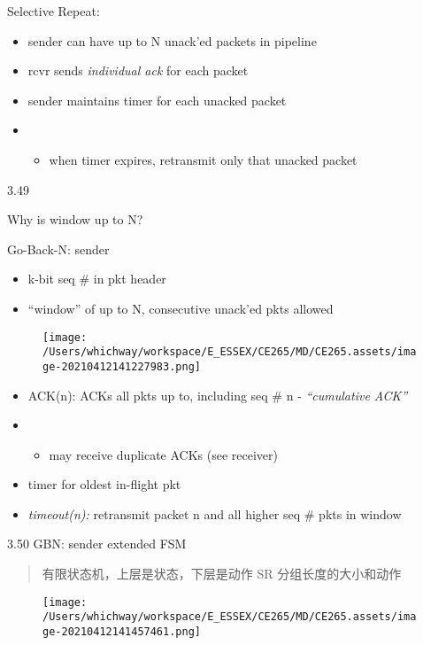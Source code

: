 \documentclass[
]{article}
\begin{document}
Selective Repeat:

\begin{itemize}
\item
  sender can have up to N unack'ed packets in pipeline
\item
  rcvr sends \emph{individual ack} for each packet
\item
  sender maintains timer for each unacked packet
\item
  \begin{itemize}
  \item
    when timer expires, retransmit only that unacked packet
  \end{itemize}
\end{itemize}

3.49

Why is window up to N?

Go-Back-N: sender

\begin{itemize}
\item
  k-bit seq \# in pkt header
\item
  ``window'' of up to N, consecutive unack'ed pkts allowed
\end{itemize}

\begin{figure}
\centering
\texttt{[image: /Users/whichway/workspace/E\_ESSEX/CE265/MD/CE265.assets/image-20210412141227983.png]}
\caption{}
\end{figure}

\begin{itemize}
\item
  ACK(n): ACKs all pkts up to, including seq \# n - \emph{``cumulative
  ACK''}
\item
  \begin{itemize}
  \item
    may receive duplicate ACKs (see receiver)
  \end{itemize}
\item
  timer for oldest in-flight pkt
\item
  \emph{timeout(n):} retransmit packet n and all higher seq \# pkts in
  window
\end{itemize}

3.50 GBN: sender extended FSM

\begin{quote}
有限状态机，上层是状态，下层是动作 SR 分组长度的大小和动作
\end{quote}

\begin{figure}
\centering
\texttt{[image: /Users/whichway/workspace/E\_ESSEX/CE265/MD/CE265.assets/image-20210412141457461.png]}
\caption{}
\end{figure}
\end{document}

